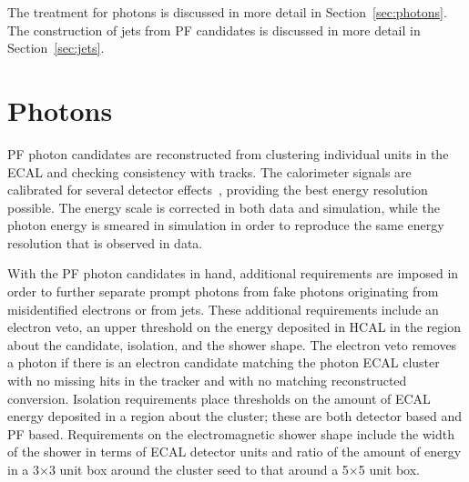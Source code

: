 The treatment for photons is discussed in more detail in Section~\ref{sec:photons}. The construction
of jets from PF candidates is discussed in more detail in Section~\ref{sec:jets}. 



\section{Photons\label{sec:photons}}

PF photon candidates are reconstructed from clustering individual units in the ECAL
and checking consistency with tracks.
The calorimeter signals are calibrated for several detector effects~\cite{CMS-PAS-EGM-10-005,ECALpaper},
providing the best energy resolution possible.
The energy scale is corrected in both data and simulation, while the photon energy is smeared in
simulation in order to reproduce the same energy resolution that is observed in data.

With the PF photon candidates in hand, additional requirements are imposed in order to further
separate prompt photons from fake photons originating from misidentified electrons or from jets.
These additional requirements include an electron veto, an upper threshold on the energy deposited
in HCAL in the region about the candidate, isolation, and the shower shape. The electron veto 
removes a photon if there is an electron candidate matching the photon ECAL cluster with no missing
hits in the tracker and with no matching reconstructed conversion.
Isolation requirements place
thresholds on the amount of ECAL energy deposited in a region about the cluster; these are both
detector based and PF based. Requirements on the electromagnetic shower shape include the
width of the shower in terms of ECAL detector units and
ratio of the amount of energy in a 3$\times$3 unit box around the cluster seed to that
around a 5$\times$5 unit box.

